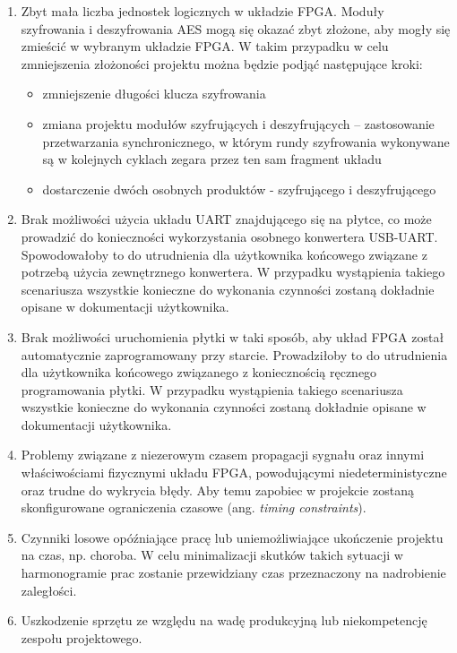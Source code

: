 \begin{enumerate}
\item Zbyt mała liczba jednostek logicznych w układzie FPGA. Moduły szyfrowania i deszyfrowania AES mogą się okazać zbyt złożone, aby mogły się zmieścić w wybranym układzie FPGA. W takim przypadku w celu zmniejszenia złożoności projektu można będzie podjąć następujące kroki:
	\begin{itemize}
	\item zmniejszenie długości klucza szyfrowania
	\item zmiana projektu modułów szyfrujących i deszyfrujących -- zastosowanie przetwarzania synchronicznego, w którym rundy szyfrowania wykonywane są w kolejnych cyklach zegara przez ten sam fragment układu
	\item dostarczenie dwóch osobnych produktów - szyfrującego i deszyfrującego
	\end{itemize}
\item Brak możliwości użycia układu UART znajdującego się na płytce, co może prowadzić do konieczności wykorzystania osobnego konwertera USB-UART. Spowodowałoby to do utrudnienia dla użytkownika końcowego związane z potrzebą użycia zewnętrznego konwertera. W przypadku wystąpienia takiego scenariusza wszystkie konieczne do wykonania czynności zostaną dokładnie opisane w dokumentacji użytkownika.
\item Brak możliwości uruchomienia płytki w taki sposób, aby układ FPGA został automatycznie zaprogramowany przy starcie. Prowadziłoby to do utrudnienia dla użytkownika końcowego związanego z koniecznością ręcznego programowania płytki. W przypadku wystąpienia takiego scenariusza wszystkie konieczne do wykonania czynności zostaną dokładnie opisane w dokumentacji użytkownika.
\item Problemy związane z niezerowym czasem propagacji sygnału oraz innymi właściwościami fizycznymi układu FPGA, powodującymi niedeterministyczne oraz trudne do wykrycia błędy. Aby temu zapobiec w projekcie zostaną skonfigurowane ograniczenia czasowe (ang. \textit{timing constraints}).
\item Czynniki losowe opóźniające pracę lub uniemożliwiające ukończenie projektu na czas, np. choroba. W celu minimalizacji skutków takich sytuacji w harmonogramie prac zostanie przewidziany czas przeznaczony na nadrobienie zaległości.
\item Uszkodzenie sprzętu ze względu na wadę produkcyjną lub niekompetencję zespołu projektowego.
\end{enumerate}


\newpage